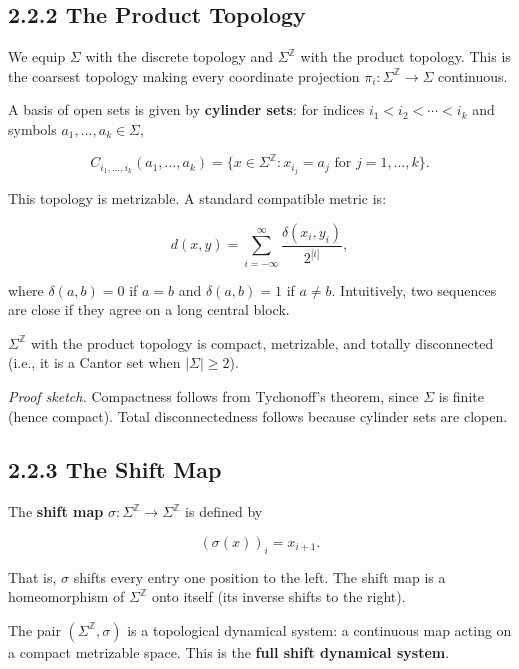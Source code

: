 \subsection{2.2.2 The Product Topology}

We equip $\Sigma$ with the discrete topology and $\Sigma^{\mathbb{Z}}$ with the product topology. This is the coarsest topology making every coordinate projection $\pi_i : \Sigma^{\mathbb{Z}} \to \Sigma$ continuous.

A basis of open sets is given by \textbf{cylinder sets}: for indices $i_1 < i_2 < \cdots < i_k$ and symbols $a_1, \ldots, a_k \in \Sigma$,

\[C_{i_1, \ldots, i_k}(a_1, \ldots, a_k) = \{ x \in \Sigma^{\mathbb{Z}} : x_{i_j} = a_j \text{ for } j = 1, \ldots, k \} .\]

This topology is metrizable. A standard compatible metric is:

\[d(x, y) = \sum_{i = -\infty}^{\infty} \frac{\delta(x_i, y_i)}{2^{|i|}},\]

where $\delta(a, b) = 0$ if $a = b$ and $\delta(a, b) = 1$ if $a \neq b$. Intuitively, two sequences are close if they agree on a long central block.

\begin{proposition}
$\Sigma^{\mathbb{Z}}$ with the product topology is compact, metrizable, and totally disconnected (i.e., it is a Cantor set when $|\Sigma| \geq 2$).

\textit{Proof sketch.} Compactness follows from Tychonoff's theorem, since $\Sigma$ is finite (hence compact). Total disconnectedness follows because cylinder sets are clopen. 

\end{proposition}

\subsection{2.2.3 The Shift Map}

\begin{definition}
The \textbf{shift map} $\sigma : \Sigma^{\mathbb{Z}} \to \Sigma^{\mathbb{Z}}$ is defined by

\[(\sigma(x))_i = x_{i+1}.\]

That is, $\sigma$ shifts every entry one position to the left. The shift map is a homeomorphism of $\Sigma^{\mathbb{Z}}$ onto itself (its inverse shifts to the right).

The pair $(\Sigma^{\mathbb{Z}}, \sigma)$ is a topological dynamical system: a continuous map acting on a compact metrizable space. This is the \textbf{full shift dynamical system}.
\end{definition}



